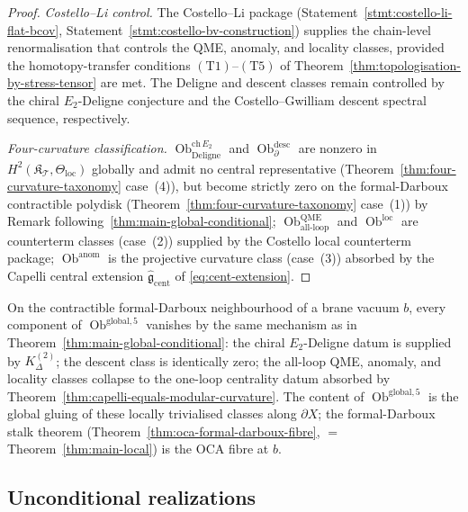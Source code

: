 \begin{proof}
\emph{Costello--Li control.}  The Costello--Li package
(Statement~\ref{stmt:costello-li-flat-bcov},
Statement~\ref{stmt:costello-bv-construction}) supplies the
chain-level renormalisation that controls the QME, anomaly, and
locality classes, provided the homotopy-transfer conditions
\((\mathrm{T1})\)--\((\mathrm{T5})\) of
Theorem~\ref{thm:topologisation-by-stress-tensor} are met.  The Deligne
and descent classes remain controlled by the chiral
\(E_2\)-Deligne conjecture and the Costello--Gwilliam descent spectral
sequence, respectively.

\emph{Four-curvature classification.}
\(\operatorname{Ob}^{\mathrm{ch}\,E_2}_{\mathrm{Deligne}}\) and
\(\operatorname{Ob}^{\mathrm{desc}}_{\partial}\) are nonzero in
\(H^2(\mathfrak K_{\mathcal T},\Theta_{\mathrm{loc}})\) globally and
admit no central representative
(Theorem~\ref{thm:four-curvature-taxonomy} case~(4)), but become
strictly zero on the formal-Darboux contractible polydisk
(Theorem~\ref{thm:four-curvature-taxonomy} case~(1)) by
Remark following~\ref{thm:main-global-conditional};
\(\operatorname{Ob}^{\mathrm{QME}}_{\mathrm{all\mbox{-}loop}}\) and
\(\operatorname{Ob}^{\mathrm{loc}}\) are counterterm classes
(case~(2)) supplied by the Costello local counterterm package;
\(\operatorname{Ob}^{\mathrm{anom}}\) is the projective curvature
class (case~(3)) absorbed by the Capelli central extension
\(\widehat{\mathfrak g}_{\mathrm{cent}}\) of
\eqref{eq:cent-extension}.
\end{proof}

\begin{rmk}
\label{rmk:local-trivialisation-supremum-form}
On the contractible formal-Darboux neighbourhood of a brane vacuum
\(b\), every component of \(\operatorname{Ob}^{\mathrm{global,5}}\)
vanishes by the same mechanism as in
Theorem~\ref{thm:main-global-conditional}: the chiral
\(E_2\)-Deligne datum is supplied by \(K^{(2)}_\Delta\); the descent
class is identically zero; the all-loop QME, anomaly, and locality
classes collapse to the one-loop centrality datum absorbed by
Theorem~\ref{thm:capelli-equals-modular-curvature}.  The content of
\(\operatorname{Ob}^{\mathrm{global,5}}\) is the global gluing of
these locally trivialised classes along \(\partial X\); the
formal-Darboux stalk theorem (Theorem~\ref{thm:oca-formal-darboux-fibre},
\(=\) Theorem~\ref{thm:main-local}) is the OCA fibre at \(b\).
\end{rmk}

\subsection{Unconditional realizations}\label{ssec:unconditional-realizations}

